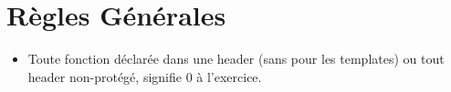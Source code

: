 

\chapter{Règles Générales}


    \begin{itemize}
        \item Toute fonction déclarée dans une header (sans pour les templates)
            ou tout header non-protégé, signifie 0 à l'exercice.
        

\end{itemize}
